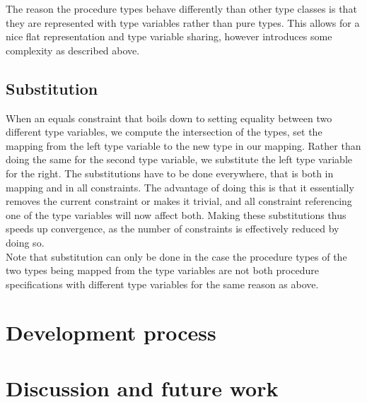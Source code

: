 \documentclass[a4paper]{article}
\begin{document}
The reason the procedure types behave differently than other type classes is that
they are represented with type variables rather than pure types.
This allows for a nice flat representation and type variable sharing,
however introduces some complexity as described above.

\subsection{Substitution}

When an equals constraint that boils down to setting equality between two different
type variables, we compute the intersection of the types, set the mapping from the
left type variable to the new type in our mapping.
Rather than doing the same for the second type variable, we substitute the left type
variable for the right.
The substitutions have to be done everywhere, that is both in mapping and in all constraints.
The advantage of doing this is that it essentially removes the current constraint
or makes it trivial, and all constraint referencing one of the type variables will
now affect both.
Making these substitutions thus speeds up convergence, as the number of constraints
is effectively reduced by doing so.\\

Note that substitution can only be done in the case the procedure types
of the two types being mapped from the type variables are not both procedure specifications
with different type variables for the same reason as above.

\section{Development process}


\section{Discussion and future work}


\end{document}
